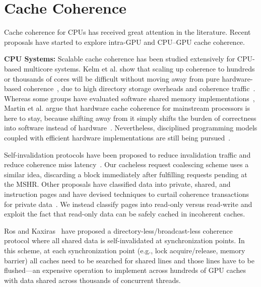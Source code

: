 \section{Cache Coherence}
Cache coherence for CPUs has received great attention in the literature.  Recent
proposals have started to explore intra-GPU and CPU--GPU cache coherence.

\textbf{CPU Systems:} Scalable cache coherence has been studied extensively for
CPU-based multicore systems. Kelm et al. show that scaling up coherence to
hundreds or thousands of cores will be difficult without moving away from pure
hardware-based coherence~\cite{Kelm2009,Hill92}, due to high directory storage
overheads and coherence traffic~\cite{Lebeck95,Cheng06}.  Whereas some groups
have evaluated software shared memory implementations~\cite{Falsafi94,Hill92},
Martin et al. argue that hardware cache coherence for mainstream processors is
here to stay, because shifting away from it simply shifts the burden of
correctness into software instead of hardware~\cite{Martin2012}. Nevertheless,
disciplined programming models coupled with efficient hardware implementations
are still being pursued~\cite{choi2011,Sung2013,Sung2015}.

Self-invalidation protocols have been proposed to reduce invalidation traffic
and reduce coherence miss latency~\cite{Lebeck95,Lai2000}. Our cacheless request
coalescing scheme uses a similar idea, discarding a block immediately after
fulfilling requests pending at the MSHR.  Other proposals have classified data
into private, shared, and instruction pages and have devised techniques to
curtail coherence transactions for private
data~\cite{Pugsley2010,Hardavellas2009,Cuesta2011,Ros2012}. We instead classify
pages into read-only versus read-write and exploit the fact that read-only data
can be safely cached in incoherent caches.

Ros and Kaxiras~\cite{Ros2012} have proposed a
directory\hyp{}less\slash{}broadcast\hyp{}less coherence protocol where all
shared data is self\hyp{}invalidated at synchronization points. In this scheme,
at each synchronization point (e.g., lock acquire/release, memory barrier) all
caches need to be searched for shared lines and those lines have to be
flushed---an expensive operation to implement across hundreds of GPU caches with
data shared across thousands of concurrent threads.

